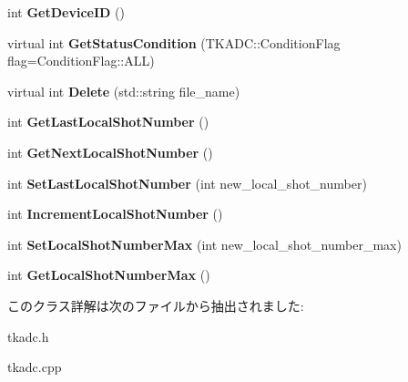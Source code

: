 \begin{DoxyCompactItemize}
int {\bfseries Get\+Device\+ID} ()
\item 
\mbox{\label{class_t_k_a_d_c_af97c5fe3c01c209e154362e9dff27516}} 
virtual int {\bfseries Get\+Status\+Condition} (T\+K\+A\+D\+C\+::\+Condition\+Flag flag=Condition\+Flag\+::\+A\+LL)
\item 
\mbox{\label{class_t_k_a_d_c_a341d18580fbda1d2e2fc9a701c16d9bf}} 
virtual int {\bfseries Delete} (std\+::string file\+\_\+name)
\item 
\mbox{\label{class_t_k_a_d_c_a05193b85e821bec540ed791bfe82e44e}} 
int {\bfseries Get\+Last\+Local\+Shot\+Number} ()
\item 
\mbox{\label{class_t_k_a_d_c_a7b9b8489b91d83c871b668ea64270c94}} 
int {\bfseries Get\+Next\+Local\+Shot\+Number} ()
\item 
\mbox{\label{class_t_k_a_d_c_ae851f7ca77f99481728881fb93576ae0}} 
int {\bfseries Set\+Last\+Local\+Shot\+Number} (int new\+\_\+local\+\_\+shot\+\_\+number)
\item 
\mbox{\label{class_t_k_a_d_c_af3a90b165c7007a26d3ea8869970745a}} 
int {\bfseries Increment\+Local\+Shot\+Number} ()
\item 
\mbox{\label{class_t_k_a_d_c_aa4145e024d074942bfd85777a0419cec}} 
int {\bfseries Set\+Local\+Shot\+Number\+Max} (int new\+\_\+local\+\_\+shot\+\_\+number\+\_\+max)
\item 
\mbox{\label{class_t_k_a_d_c_aa238169ef582140e6c19f84003915d87}} 
int {\bfseries Get\+Local\+Shot\+Number\+Max} ()
\end{DoxyCompactItemize}


このクラス詳解は次のファイルから抽出されました\+:\begin{DoxyCompactItemize}
\item 
tkadc.\+h\item 
tkadc.\+cpp\end{DoxyCompactItemize}
